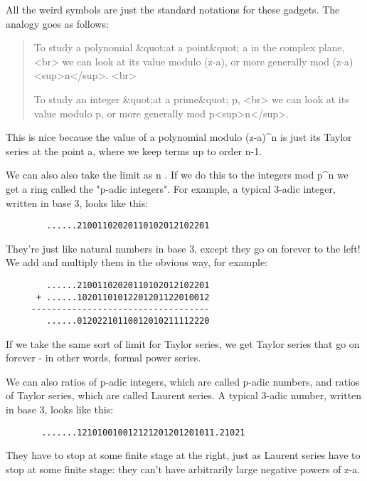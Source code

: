 All the weird symbols are just the standard notations for these gadgets.
The analogy goes as follows:

\begin{quote}
   To study a polynomial &quot;at a point&quot; a in the complex plane, <br>
   we can look at its value modulo (z-a),  
   or more generally mod (z-a)<sup>n</sup>. <br>
   
   To study an integer &quot;at a prime&quot; p, <br>
   we can look at its value modulo p, 
  or more generally mod p<sup>n</sup>.
\end{quote}
    

This is nice because the value of a polynomial modulo
(z-a)^{n} is just its Taylor series at the point a, where we
keep terms up to order n-1.

We can also also take the limit as n \to  \infty .  If we do this to
the integers mod p^{n} we get a ring called the "p-adic
integers".  For example, a typical 3-adic integer, written in
base 3, looks like this:

\begin{verbatim}
        ......21001102020110102012102201
\end{verbatim}
    
They're just like natural numbers in base 3, except they go on forever to the
left!  We add and multiply them in the obvious way, for example:

\begin{verbatim}
        ......21001102020110102012102201
      + ......10201101012201201122010012
     -----------------------------------
        ......01202210110012010211112220
\end{verbatim}
    
If we take the same sort of limit for Taylor series, we get Taylor series 
that go on forever - in other words, formal power series.  

We can also ratios of p-adic integers, which are called p-adic numbers,
and ratios of Taylor series, which are called Laurent series.   A typical
3-adic number, written in base 3, looks like this:

\begin{verbatim}
       .......121010010012121201201201011.21021
\end{verbatim}
    
They have to stop at some finite stage at the right, just as Laurent
series have to stop at some finite stage: they can't have arbitrarily
large negative powers of z-a.  
                     
